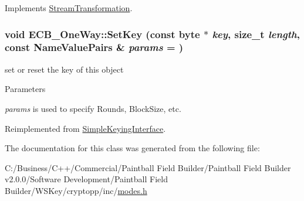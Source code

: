 Implements \hyperlink{class_stream_transformation_a26feabde21bc4d1783195969733e3bb0}{StreamTransformation}.\hypertarget{class_e_c_b___one_way_aea389c964114b73390dd81d836124461}{
\subsubsection[{SetKey}]{\setlength{\rightskip}{0pt plus 5cm}void ECB\_\-OneWay::SetKey (const byte $\ast$ {\em key}, \/  size\_\-t {\em length}, \/  const {\bf NameValuePairs} \& {\em params} = {})}}
\label{class_e_c_b___one_way_aea389c964114b73390dd81d836124461}


set or reset the key of this object 
\begin{DoxyParams}{Parameters}
\item[{\em params}]is used to specify Rounds, BlockSize, etc. \end{DoxyParams}


Reimplemented from \hyperlink{class_simple_keying_interface_a97a47c942b6ce983d9ea6b58f22d5209}{SimpleKeyingInterface}.

The documentation for this class was generated from the following file:\begin{DoxyCompactItemize}
\item 
C:/Business/C++/Commercial/Paintball Field Builder/Paintball Field Builder v2.0.0/Software Development/Paintball Field Builder/WSKey/cryptopp/inc/\hyperlink{modes_8h}{modes.h}\end{DoxyCompactItemize}
